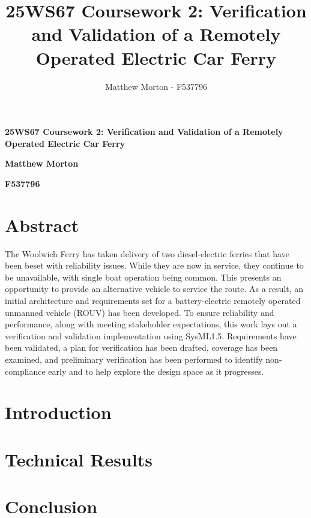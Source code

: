 \documentclass[11pt]{article}
\title{25WS67 Coursework 2: Verification and Validation of a Remotely Operated Electric Car Ferry}
\author{Matthew Morton - F537796}
\begin{document}
\begin{center}
    \textbf{25WS67 Coursework 2: Verification and Validation of a Remotely Operated Electric Car Ferry}

    \textbf{Matthew Morton}

    \textbf{F537796}
\end{center}

\linespread{1.15}

\section*{Abstract}
The Woolwich Ferry has taken delivery of two diesel-electric ferries that have been beset with reliability issues. While they are now in service, they continue to be unavailable, with single boat operation being common. This presents an opportunity to provide an alternative vehicle to service the route. As a result, an initial architecture and requirements set for a battery-electric remotely operated unmanned vehicle (ROUV) has been developed. To ensure reliability and performance, along with meeting stakeholder expectations, this work lays out a verification and validation implementation using SysML1.5. Requirements have been validated, a plan for verification has been drafted, coverage has been examined, and preliminary verification has been performed to identify non-compliance early and to help explore the design space as it progresses.

\hrulefill

\tableofcontents

\hrulefill

\clearpage

\section{Introduction}



\clearpage

\section{Technical Results}



\clearpage

\section{Conclusion}



\clearpage

\printbibliography[heading=bibintoc, title=References]{}
\end{document}
